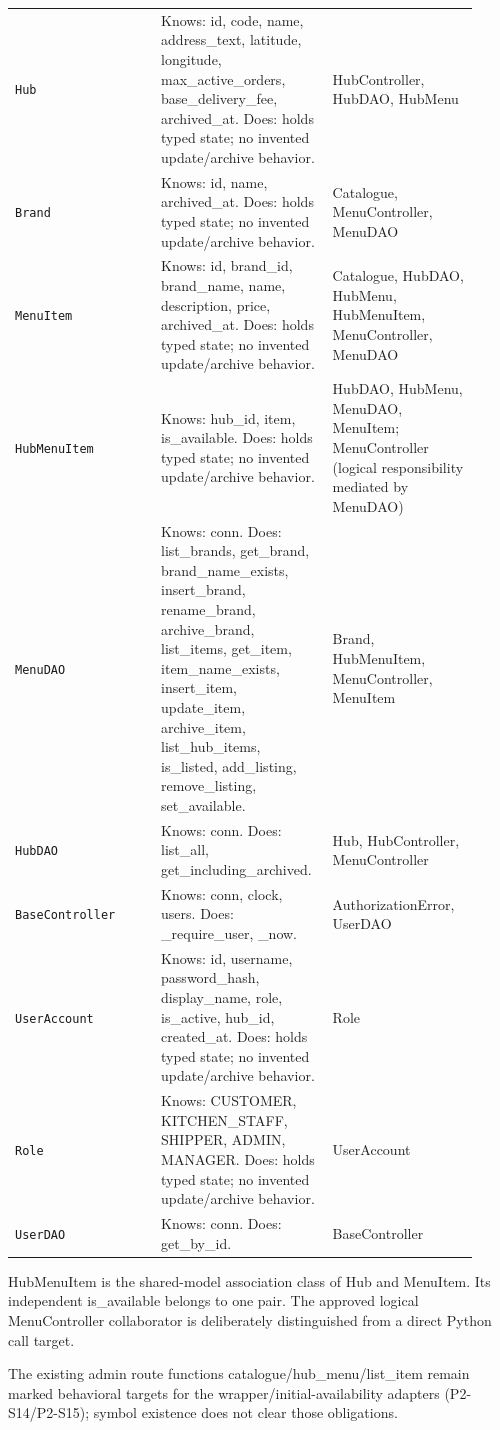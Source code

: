 \begin{longtable}{>{\raggedright\arraybackslash}p{0.3067\linewidth}>{\raggedright\arraybackslash}p{0.3067\linewidth}>{\raggedright\arraybackslash}p{0.3067\linewidth}}
\texttt{Hub} & Knows: id, code, name, address\_text, latitude, longitude, max\_active\_orders, base\_delivery\_fee, archived\_at. Does: holds typed state; no invented update/archive behavior. & HubController, HubDAO, HubMenu \\
\texttt{Brand} & Knows: id, name, archived\_at. Does: holds typed state; no invented update/archive behavior. & Catalogue, MenuController, MenuDAO \\
\texttt{MenuItem} & Knows: id, brand\_id, brand\_name, name, description, price, archived\_at. Does: holds typed state; no invented update/archive behavior. & Catalogue, HubDAO, HubMenu, HubMenuItem, MenuController, MenuDAO \\
\texttt{HubMenuItem} & Knows: hub\_id, item, is\_available. Does: holds typed state; no invented update/archive behavior. & HubDAO, HubMenu, MenuDAO, MenuItem; MenuController (logical responsibility mediated by MenuDAO) \\
\texttt{MenuDAO} & Knows: conn. Does: list\_brands, get\_brand, brand\_name\_exists, insert\_brand, rename\_brand, archive\_brand, list\_items, get\_item, item\_name\_exists, insert\_item, update\_item, archive\_item, list\_hub\_items, is\_listed, add\_listing, remove\_listing, set\_available. & Brand, HubMenuItem, MenuController, MenuItem \\
\texttt{HubDAO} & Knows: conn. Does: list\_all, get\_including\_archived. & Hub, HubController, MenuController \\
\texttt{BaseController} & Knows: conn, clock, users. Does: \_require\_user, \_now. & AuthorizationError, UserDAO \\
\texttt{UserAccount} & Knows: id, username, password\_hash, display\_name, role, is\_active, hub\_id, created\_at. Does: holds typed state; no invented update/archive behavior. & Role \\
\texttt{Role} & Knows: CUSTOMER, KITCHEN\_STAFF, SHIPPER, ADMIN, MANAGER. Does: holds typed state; no invented update/archive behavior. & UserAccount \\
\texttt{UserDAO} & Knows: conn. Does: get\_by\_id. & BaseController \\
\end{longtable}
HubMenuItem is the shared-model association class of Hub and MenuItem. Its independent is\_available belongs to one pair. The approved logical MenuController collaborator is deliberately distinguished from a direct Python call target.

The existing admin route functions catalogue/hub\_menu/list\_item remain marked behavioral targets for the wrapper/initial-availability adapters (P2-S14/P2-S15); symbol existence does not clear those obligations.
